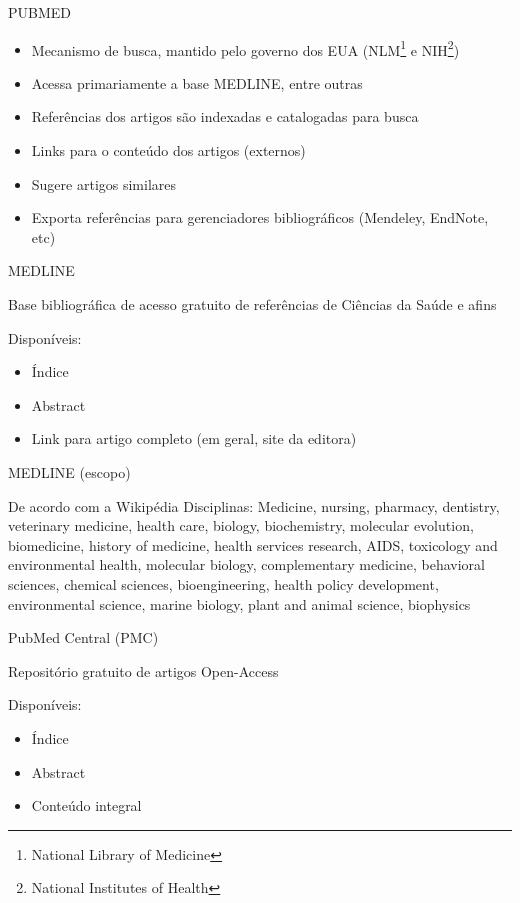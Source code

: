 \documentclass{beamer}
\begin{document}
\begin{frame}{PUBMED}
  \begin{itemize}
  \item \alert{Mecanismo de busca}, mantido pelo governo dos EUA
    (NLM\footnote{National Library of Medicine} e
    NIH\footnote{National Institutes of Health})
  \item Acessa primariamente a base MEDLINE, entre outras
  \item Referências dos artigos são indexadas e catalogadas para busca
  \item Links para o conteúdo dos artigos (externos)
  \item Sugere artigos similares
  \item Exporta referências para gerenciadores bibliográficos
    (Mendeley, EndNote, etc)
  \end{itemize}
\end{frame}

\begin{frame}{MEDLINE}
  \begin{definition}
    Base bibliográfica de acesso gratuito de referências de Ciências
    da Saúde e afins
  \end{definition}
  Disponíveis:
  \begin{itemize}
  \item Índice
  \item Abstract
  \item Link para artigo completo (em geral, site da editora)
  \end{itemize}
\end{frame}

\begin{frame}{MEDLINE (escopo)}
  \begin{block}{De acordo com a Wikipédia}
    Disciplinas: Medicine, nursing, pharmacy, dentistry, veterinary
    medicine, health care, biology, biochemistry, molecular evolution,
    biomedicine, history of medicine, health services research, AIDS,
    toxicology and environmental health, molecular biology,
    complementary medicine, behavioral sciences, chemical sciences,
    bioengineering, health policy development, environmental science,
    marine biology, plant and animal science, biophysics
  \end{block}
\end{frame}

\begin{frame}{PubMed Central (PMC)}
  \begin{definition}
    Repositório gratuito de artigos Open-Access
  \end{definition}
  Disponíveis:
  \begin{itemize}
  \item Índice
  \item Abstract
  \item Conteúdo integral
  \end{itemize}
\end{frame}
\end{document}
